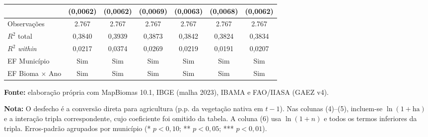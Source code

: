 \begin{table}[htbp]
\begin{tabular}{lcccccc}
 & (0,0062) & (0,0062) & (0,0069) & (0,0063) & (0,0068) & (0,0062) \\
\midrule
Observações & 2.767 & 2.767 & 2.767 & 2.767 & 2.767 & 2.767 \\
$R^2$ total & 0,3840 & 0,3939 & 0,3873 & 0,3842 & 0,3824 & 0,3834 \\
$R^2$ \textit{within} & 0,0217 & 0,0374 & 0,0269 & 0,0219 & 0,0191 & 0,0207 \\
EF Município & Sim & Sim & Sim & Sim & Sim & Sim \\
EF Bioma $\times$ Ano & Sim & Sim & Sim & Sim & Sim & Sim \\
\bottomrule
\end{tabular}
\par\smallskip\begin{minipage}{\textwidth}\footnotesize
\SingleSpacing
\noindent\textbf{Fonte:} elaboração própria com MapBiomas 10.1, IBGE (malha 2023), IBAMA e FAO/IIASA (GAEZ v4).\par\medskip
\noindent\textbf{Nota:} O desfecho é a conversão direta para agricultura (p.p. da vegetação nativa em $t-1$). Nas colunas (4)--(5), incluem-se $\ln(1+\text{ha})$ e a interação tripla correspondente, cujo coeficiente foi omitido da tabela. A coluna (6) usa $\ln(1+n)$ e todos os termos inferiores da tripla. Erros-padrão agrupados por município (* $p<0{,}10$; ** $p<0{,}05$; *** $p<0{,}01$).
\end{minipage}
\end{table}

